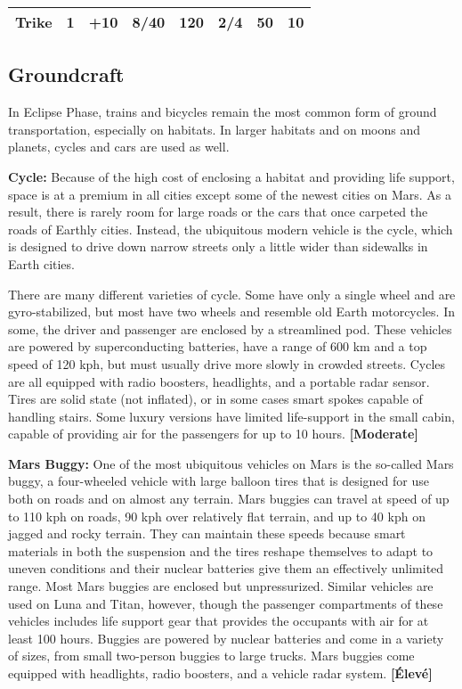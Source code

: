{{\begin{table}
\begin{tabularx}{\textwidth}{|X|X|X|X|X|X|X|X|}
Trike	&1	&+10	&8/40	&120	&2/4	&50	&10 \\ \hline

\end{tabularx} \label{tab:exoskeletons} \end{table} 









\subsection{Groundcraft} \label{sec:groundcraft} 

In Eclipse Phase, trains and bicycles remain the most common form of ground transportation, especially on habitats. In larger habitats and on moons and planets, cycles and cars are used as well. 

\textbf{Cycle:} Because of the high cost of enclosing a habitat and providing life support, space is at a premium in all cities except some of the newest cities on Mars. As a result, there is rarely room for large roads or the cars that once carpeted the roads of Earthly cities. Instead, the ubiquitous modern vehicle is the cycle, which is designed to drive down narrow streets only a little wider than sidewalks in Earth cities. 

There are many different varieties of cycle. Some have only a single wheel and are gyro-stabilized, but most have two wheels and resemble old Earth motorcycles. In some, the driver and passenger are enclosed by a streamlined pod. These vehicles are powered by superconducting batteries, have a range of 600 km and a top speed of 120 kph, but must usually drive more slowly in crowded streets. Cycles are all equipped with radio boosters, headlights, and a portable radar sensor. Tires are solid state (not inflated), or in some cases smart spokes capable of handling stairs. Some luxury versions have limited life-support in the small cabin, capable of providing air for the passengers for up to 10 hours. \textbf{[Moderate]} 

\textbf{Mars Buggy:} One of the most ubiquitous vehicles on Mars is the so-called Mars buggy, a four-wheeled vehicle with large balloon tires that is designed for use both on roads and on almost any terrain. Mars buggies can travel at speed of up to 110 kph on roads, 90 kph over relatively flat terrain, and up to 40 kph on jagged and rocky terrain. They can maintain these speeds because smart materials in both the suspension and the tires reshape themselves to adapt to uneven conditions and their nuclear batteries give them an effectively unlimited range. Most Mars buggies are enclosed but unpressurized. Similar vehicles are used on Luna and Titan, however, though the passenger compartments of these vehicles includes life support gear that provides the occupants with air for at least 100 hours. Buggies are powered by nuclear batteries and come in a variety of sizes, from small two-person buggies to large trucks. Mars buggies come equipped with headlights, radio boosters, and a vehicle radar system. \textbf{[Élevé]} 

}}
